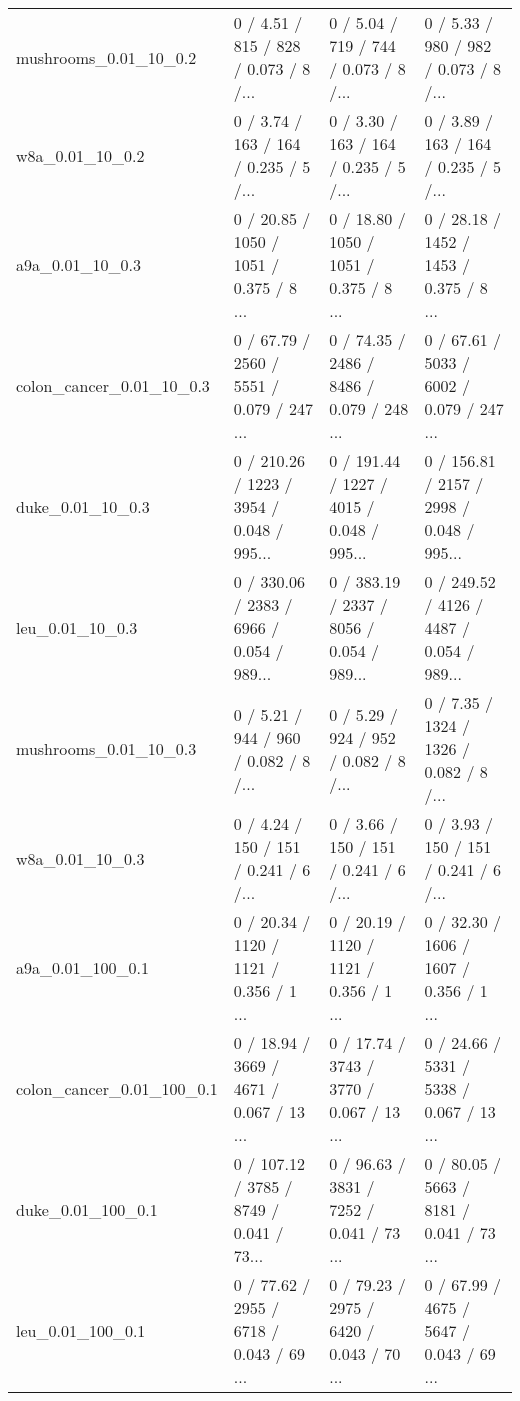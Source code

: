 \begin{tabular}{llll}
     mushrooms\_0.01\_10\_0.2 &  0 / 4.51 /    815 /     828 / 0.073 /      8 /... &  0 / 5.04 /    719 /     744 / 0.073 /      8 /... &  0 / 5.33 /    980 /     982 / 0.073 /      8 /... \\
           w8a\_0.01\_10\_0.2 &  0 / 3.74 /    163 /     164 / 0.235 /      5 /... &  0 / 3.30 /    163 /     164 / 0.235 /      5 /... &  0 / 3.89 /    163 /     164 / 0.235 /      5 /... \\
           a9a\_0.01\_10\_0.3 &  0 / 20.85 /   1050 /    1051 / 0.375 /      8 ... &  0 / 18.80 /   1050 /    1051 / 0.375 /      8 ... &  0 / 28.18 /   1452 /    1453 / 0.375 /      8 ... \\
  colon\_cancer\_0.01\_10\_0.3 &  0 / 67.79 /   2560 /    5551 / 0.079 /    247 ... &  0 / 74.35 /   2486 /    8486 / 0.079 /    248 ... &  0 / 67.61 /   5033 /    6002 / 0.079 /    247 ... \\
          duke\_0.01\_10\_0.3 &  0 / 210.26 /   1223 /    3954 / 0.048 /    995... &  0 / 191.44 /   1227 /    4015 / 0.048 /    995... &  0 / 156.81 /   2157 /    2998 / 0.048 /    995... \\
           leu\_0.01\_10\_0.3 &  0 / 330.06 /   2383 /    6966 / 0.054 /    989... &  0 / 383.19 /   2337 /    8056 / 0.054 /    989... &  0 / 249.52 /   4126 /    4487 / 0.054 /    989... \\
     mushrooms\_0.01\_10\_0.3 &  0 / 5.21 /    944 /     960 / 0.082 /      8 /... &  0 / 5.29 /    924 /     952 / 0.082 /      8 /... &  0 / 7.35 /   1324 /    1326 / 0.082 /      8 /... \\
           w8a\_0.01\_10\_0.3 &  0 / 4.24 /    150 /     151 / 0.241 /      6 /... &  0 / 3.66 /    150 /     151 / 0.241 /      6 /... &  0 / 3.93 /    150 /     151 / 0.241 /      6 /... \\
          a9a\_0.01\_100\_0.1 &  0 / 20.34 /   1120 /    1121 / 0.356 /      1 ... &  0 / 20.19 /   1120 /    1121 / 0.356 /      1 ... &  0 / 32.30 /   1606 /    1607 / 0.356 /      1 ... \\
 colon\_cancer\_0.01\_100\_0.1 &  0 / 18.94 /   3669 /    4671 / 0.067 /     13 ... &  0 / 17.74 /   3743 /    3770 / 0.067 /     13 ... &  0 / 24.66 /   5331 /    5338 / 0.067 /     13 ... \\
         duke\_0.01\_100\_0.1 &  0 / 107.12 /   3785 /    8749 / 0.041 /     73... &  0 / 96.63 /   3831 /    7252 / 0.041 /     73 ... &  0 / 80.05 /   5663 /    8181 / 0.041 /     73 ... \\
          leu\_0.01\_100\_0.1 &  0 / 77.62 /   2955 /    6718 / 0.043 /     69 ... &  0 / 79.23 /   2975 /    6420 / 0.043 /     70 ... &  0 / 67.99 /   4675 /    5647 / 0.043 /     69 ... \\

\end{tabular}
